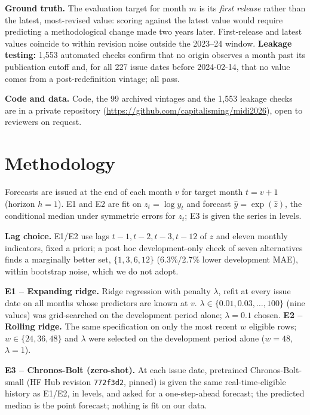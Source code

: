 \documentclass[runningheads]{llncs}
\begin{document}
\textbf{Ground truth.} The evaluation target for month $m$ is its \emph{first release} rather than
the latest, most-revised value: scoring against the latest value would require predicting a
methodological change made two years later. First-release and latest values coincide to within
revision noise outside the 2023--24 window. \textbf{Leakage testing:} 1{,}553 automated checks
confirm that no origin observes a month past its publication cutoff and, for all 227 issue dates
before 2024-02-14, that no value comes from a post-redefinition vintage; all pass.

\textbf{Code and data.} Code, the 99 archived vintages and the 1{,}553 leakage checks are in a private
repository (\url{https://github.com/capitalisming/midi2026}), open to reviewers on request.

\section{Methodology}
\label{sec:methodology}

Forecasts are issued at the end of each month $v$ for target month $t = v+1$ (horizon $h=1$).
E1 and E2 are fit on $z_t = \log y_t$ and forecast $\hat y = \exp(\hat z)$, the conditional median
under symmetric errors for $z_t$; E3 is given the series in levels.

\textbf{Lag choice.} E1/E2 use lags $t-1,t-2,t-3,t-12$ of $z$ and eleven monthly indicators, fixed a
priori; a post hoc development-only check of seven alternatives finds a marginally better set,
$\{1,3,6,12\}$ (6.3\%/2.7\% lower development MAE), within bootstrap noise, which we do not adopt.

\textbf{E1 -- Expanding ridge.} Ridge regression with penalty $\lambda$, refit at every issue date
on all months whose predictors are known at $v$. $\lambda \in \{0.01, 0.03, \dots, 100\}$ (nine
values) was grid-searched on the development period alone; $\lambda=0.1$ chosen.
\textbf{E2 -- Rolling ridge.} The same specification on only the most recent $w$ eligible rows;
$w \in \{24, 36, 48\}$ and $\lambda$ were selected on the development period alone ($w=48$,
$\lambda=1$).

\textbf{E3 -- Chronos-Bolt (zero-shot).} At each issue date, pretrained Chronos-Bolt-small
\cite{ansari2024chronos,chronosbolt} (HF Hub revision \texttt{772f3d2}, pinned) is given the same
real-time-eligible history as E1/E2, in levels, and asked for a one-step-ahead forecast; the
predicted median is the point forecast; nothing is fit on our data.
\end{document}

